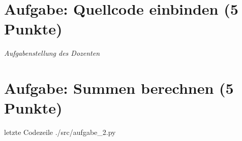 
\newcommand{\dozent}{Prof. Dr. Claudia Müller-Birn, Barry Linnert}					%
\newcommand{\tutor}{Thierry Meurers}						%
\newcommand{\tutoriumNo}{10}				%
\newcommand{\ubungNo}{01}									%
\newcommand{\veranstaltung}{Objektorientierte Programmierung}	%
\newcommand{\semester}{SoSe 17}						%
\newcommand{\studenten}{Stefaan Hessmann, Jaap Pedersen, Mark Niehues}			%




\section{Aufgabe: Quellcode einbinden \hfill (5 Punkte)}
{\itshape Aufgabenstellung des Dozenten}

\section{Aufgabe: Summen berechnen \hfill (5 Punkte)}

 letzte Codezeile
{./src/aufgabe_2.py}

